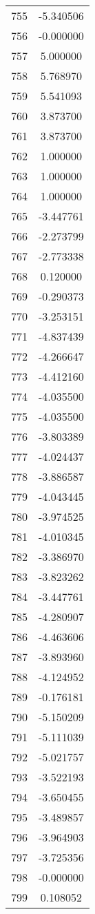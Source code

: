 \documentclass[12pt]{article}
\begin{document}
\begin{longtable}{@{}cc@{}}
755 & -5.340506 \\
756 & -0.000000 \\
757 & 5.000000 \\
758 & 5.768970 \\
759 & 5.541093 \\
760 & 3.873700 \\
761 & 3.873700 \\
762 & 1.000000 \\
763 & 1.000000 \\
764 & 1.000000 \\
765 & -3.447761 \\
766 & -2.273799 \\
767 & -2.773338 \\
768 & 0.120000 \\
769 & -0.290373 \\
770 & -3.253151 \\
771 & -4.837439 \\
772 & -4.266647 \\
773 & -4.412160 \\
774 & -4.035500 \\
775 & -4.035500 \\
776 & -3.803389 \\
777 & -4.024437 \\
778 & -3.886587 \\
779 & -4.043445 \\
780 & -3.974525 \\
781 & -4.010345 \\
782 & -3.386970 \\
783 & -3.823262 \\
784 & -3.447761 \\
785 & -4.280907 \\
786 & -4.463606 \\
787 & -3.893960 \\
788 & -4.124952 \\
789 & -0.176181 \\
790 & -5.150209 \\
791 & -5.111039 \\
792 & -5.021757 \\
793 & -3.522193 \\
794 & -3.650455 \\
795 & -3.489857 \\
796 & -3.964903 \\
797 & -3.725356 \\
798 & -0.000000 \\
799 & 0.108052 \\

\end{longtable}
\end{document}
